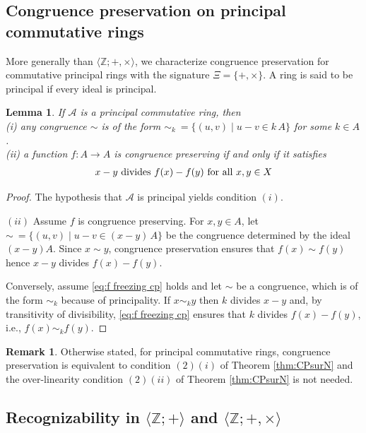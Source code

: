 \documentclass[11pt,a4paper]{article}
\newtheorem{lemma}[theorem]{Lemma}
\theoremstyle{definition} %
\newtheorem{remark}[theorem]{Remark}
\newcommand\+[1]{\mathcal{#1}} %
\newcommand{\N}{{\mathbb N}}     %
\newcommand{\Z}{{\mathbb Z}}     %
\begin{document}
\subsection{Congruence preservation on principal commutative rings}\label{subsec:cppcr}
More generally than $\langle  \Z ;+,\times\rangle$, we  characterize congruence preservation for commutative principal rings with the signature $\Xi=\{+,\times\}$. A ring is said to be principal if every ideal is principal.
\begin{lemma}\label{lem:CPsurA}
If $\+A$ is a principal commutative ring, then\\
(i) any congruence $\sim$ is of the form
$\sim_k \ =\{(u,v)\mid u-v\in k\,A\}$ for some $k\in A$.\\
(ii) a function $f:A\to A$ is congruence preserving if and only if it satisfies
\begin{equation}\label{eq:f freezing cp}
\text{\begin{tabular}{l}
$x-y$ divides $f(x)-f(y)$ for all $x,y\in X$\end{tabular}}
\end{equation}
\end{lemma}
%
\begin{proof} 
 The hypothesis that $\+A$ is principal yields condition $(i)$.

$(ii)$ 
Assume $f$ is congruence preserving. For $x,y\in A$,
 let $\sim\ =\{(u,v)\mid u-v\in (x-y)\,A\}$ be the congruence 
determined by the ideal $(x-y) A$.
Since $x\sim y$, congruence preservation ensures that $f(x)\sim f(y)$
hence $x-y$ divides $f(x)-f(y)$.

Conversely, assume \eqref{eq:f freezing cp} holds and let $\sim$ be a congruence, which is of the form $\sim_k$ because of principality.
If  $x\sim_k y$ then $k$ divides $x-y$ and, by transitivity of divisibility,
\eqref{eq:f freezing cp} ensures that $k$ divides $f(x)-f(y)$, i.e., $f(x)\sim_k f(y)$.
\end{proof}
%
\begin{remark}
 Otherwise stated, for principal commutative rings, congruence preservation is equivalent  to condition $(2) (i)$ of Theorem \ref{thm:CPsurN} and  the over-linearity condition $(2) (ii)$ 
 of Theorem \ref{thm:CPsurN} is not needed.
\end{remark}


\subsection{Recognizability in $ \langle  \Z ;+\rangle$ and $ \langle  \Z ;+,\times\rangle$}\label{ss rec in Z+ and Zx}
%
\end{document}
